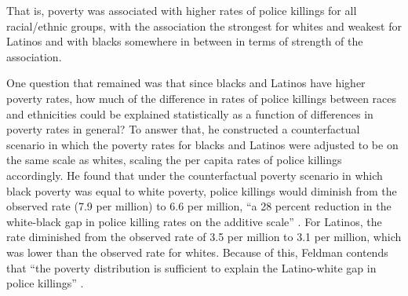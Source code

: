 \documentclass[12pt]{article}
\begin{document}
\noindent{}That is, poverty was associated with higher rates of police killings for all racial/ethnic groups, with the association the strongest for whites and weakest for Latinos and with blacks somewhere in between in terms of strength of the association.

One question that remained was that since blacks and Latinos have higher poverty rates, how much of the difference in rates of police killings between races and ethnicities could be explained statistically as a function of differences in poverty rates in general? To answer that, he constructed a counterfactual scenario in which the poverty rates for blacks and Latinos were adjusted to be on the same scale as whites, scaling the per capita rates of police killings accordingly. He found that under the counterfactual poverty scenario in which black poverty was equal to white poverty, police killings would diminish from the observed rate (7.9 per million) to 6.6 per million, “a 28 percent reduction in the white-black gap in police killing rates on the additive scale” \parencite{feldmanPoliceKillingsUS2020}. For Latinos, the rate diminished from the observed rate of 3.5 per million to 3.1 per million, which was lower than the observed rate for whites. Because of this, Feldman contends that “the poverty distribution is sufficient to explain the Latino-white gap in police killings” \parencite{feldmanPoliceKillingsUS2020}.



\end{document}
